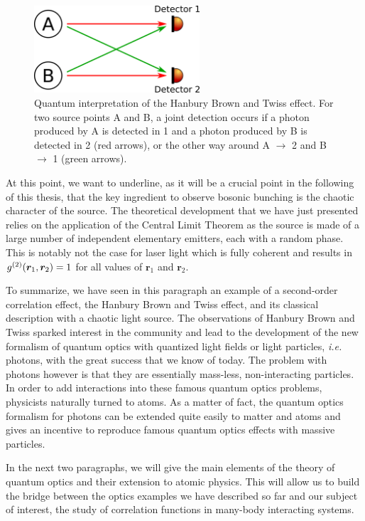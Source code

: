 \begin{figure}
    \centering
    \includegraphics[width=0.55\textwidth]{Fig/Chapter1/HBT_scheme.png}
    \caption{Quantum interpretation of the Hanbury Brown and Twiss effect. For two source points A and B, a joint detection occurs if a photon produced by A is detected in 1 and a photon produced by B is detected in 2 (red arrows), or the other way around A $\rightarrow$ 2 and B $\rightarrow$ 1 (green arrows).}
    \label{fig:HBT_scheme}
\end{figure}

At this point, we want to underline, as it will be a crucial point in the following of this thesis, that the key ingredient to observe bosonic bunching is the chaotic character of the source. The theoretical development that we have just presented relies on the application of the Central Limit Theorem as the source is made of a large number of independent elementary emitters, each with a random phase. This is notably not the case for laser light which is fully coherent and results in $g^{(2)} (\bm{r}_1,\bm{r}_2)=1$ for all values of $\bm{r}_1$ and $\bm{r}_2$.

To summarize, we have seen in this paragraph an example of a second-order correlation effect, the Hanbury Brown and Twiss effect, and its classical description with a chaotic light source. The observations of Hanbury Brown and Twiss sparked interest in the community and lead to the development of the new formalism of quantum optics \cite{glauber1963quantum} with quantized light fields or light particles, {\it i.e.} photons, with the great success that we know of today. The problem with photons however is that they are essentially mass-less, non-interacting particles. In order to add interactions into these famous quantum optics problems, physicists naturally turned to atoms. As a matter of fact, the quantum optics formalism for photons can be extended quite easily to matter and atoms and gives an incentive to reproduce famous quantum optics effects with massive particles.

In the next two paragraphs, we will give the main elements of the theory of quantum optics and their extension to atomic physics. This will allow us to build the bridge between the optics examples we have described so far and our subject of interest, the study of correlation functions in many-body interacting systems.



